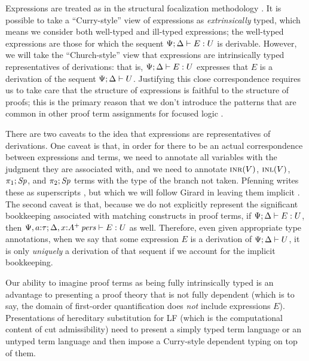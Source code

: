 Expressions are treated as in the structural focalization methodology
\cite{simmons11structural}. It is possible to take a ``Curry-style''
view of expressions as {\it extrinsically} typed, which means we
consider both well-typed and ill-typed expressions; the well-typed
expressions are those for which the sequent
${\Psi}; {\Delta} \vdash {E} : {U}$ is derivable. However, we will take the
``Church-style'' view that expressions are intrinsically typed
representatives of derivations: that is, ${\Psi}; {\Delta} \vdash {E} : {U}$
expresses that $E$ is a derivation of the sequent
${\Psi};{\Delta} \vdash {U}$. Justifying this close correspondence requires
us to take care that the structure of expressions is faithful to the
structure of proofs; this is the primary reason that we don't
introduce the patterns that are common in other proof term assignments
for focused logic
\cite{watkins02concurrent,licata08focusing,krishnaswami09focusing}.

There are two caveats to the idea that expressions are representatives
of derivations. One caveat is that, in order for there to be an actual
correspondence between expressions and terms, we need to annotate all
variables with the judgment they are associated with, and we need to
annotate $\textsc{inr}({V})$, $\textsc{inl}({V})$, $\pi_1;{{\it Sp}}$, and $\pi_2;{{\it Sp}}$
terms with the type of the branch not taken. Pfenning writes these as
superscripts \cite{pfenning08church}, but which we will follow Girard
in leaving them implicit \cite{girard89proofs}. The second caveat is
that, because we do not explicitly represent the significant
bookkeeping associated with matching constructs in proof terms, if
${\Psi}; {\Delta} \vdash {E} : {U}$, then ${\Psi, a{:}\tau}; {\Delta,
  x{:}{A^+}\,{{\it pers}}} \vdash {E} : {U}$ as well. Therefore, even given appropriate
type annotations, when we say that some expression $E$ is a derivation
of ${\Psi};{\Delta} \vdash {U}$, it is only {\it uniquely} a derivation of
that sequent if we account for the implicit bookkeeping.

Our ability to imagine proof terms as being fully intrinsically typed
is an advantage to presenting a proof theory that is not fully
dependent (which is to say, the domain of first-order quantification
does {\it not} include expressions $E$). Presentations of hereditary
substitution for LF (which is the computational content of cut
admissibility) need to present a simply typed term language
\cite{watkins02concurrent,harper07mechanizing} or an untyped term
language \cite{reed07properties,martens11mechanizing} and then impose
a Curry-style dependent typing on top of them.

